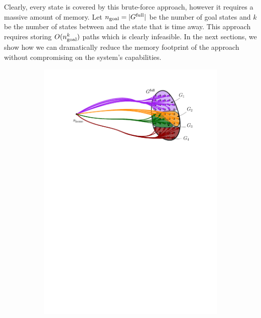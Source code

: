 \documentclass[conference]{IEEEtran}
\begin{document}
Clearly, every state is covered by this brute-force approach, however it requires a massive amount of memory.
Let $n_{\rm goal} = \vert G^{\textrm{full}} \vert$ be the number of goal states and
$k$ be the number of states between \Shome and the state that is \Trc time away.
This approach requires storing $O(n_{\rm goal}^k)$ paths which is clearly infeasible.
In the next sections, we show how we can dramatically reduce the memory footprint of the approach without compromising on the system's capabilities.



\begin{figure}[t]
    \centering
    \begin{subfigure}{.225\textwidth}
        \includegraphics[width=\textwidth]{naive1}
        \caption{}
        \label{fig:naive1}
    \end{subfigure}
    \hfill

\end{figure}
\end{document}
